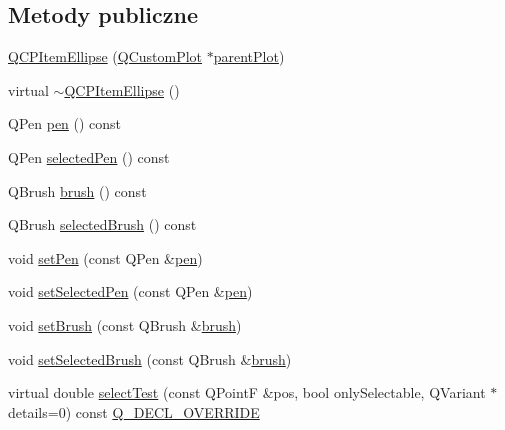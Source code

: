 \subsection*{Metody publiczne}
\begin{DoxyCompactItemize}
\item 
\hyperlink{class_q_c_p_item_ellipse_a759b77ef002515eba0263b5447ecb3fb}{Q\+C\+P\+Item\+Ellipse} (\hyperlink{class_q_custom_plot}{Q\+Custom\+Plot} $\ast$\hyperlink{class_q_c_p_layerable_ab7e0e94461566093d36ffc0f5312b109}{parent\+Plot})
\item 
virtual \hyperlink{class_q_c_p_item_ellipse_a3c17073a1805d32b4e09b6ccde0bef76}{$\sim$\+Q\+C\+P\+Item\+Ellipse} ()
\item 
Q\+Pen \hyperlink{class_q_c_p_item_ellipse_adb67471eabaf1214c99767f1653ca0ed}{pen} () const 
\item 
Q\+Pen \hyperlink{class_q_c_p_item_ellipse_ac52ab52225d238365ff3264b4b69130f}{selected\+Pen} () const 
\item 
Q\+Brush \hyperlink{class_q_c_p_item_ellipse_ac012e4fd59fdb1afb6554937bae8f7e1}{brush} () const 
\item 
Q\+Brush \hyperlink{class_q_c_p_item_ellipse_a0043e401a912d54ea3195bab0967b394}{selected\+Brush} () const 
\item 
void \hyperlink{class_q_c_p_item_ellipse_adb81a663ed2420fcfa011e49f678d1a6}{set\+Pen} (const Q\+Pen \&\hyperlink{class_q_c_p_item_ellipse_adb67471eabaf1214c99767f1653ca0ed}{pen})
\item 
void \hyperlink{class_q_c_p_item_ellipse_a6c542fba1dc918041c583f58a50dde99}{set\+Selected\+Pen} (const Q\+Pen \&\hyperlink{class_q_c_p_item_ellipse_adb67471eabaf1214c99767f1653ca0ed}{pen})
\item 
void \hyperlink{class_q_c_p_item_ellipse_a49fc74e6965834e873d027d026def798}{set\+Brush} (const Q\+Brush \&\hyperlink{class_q_c_p_item_ellipse_ac012e4fd59fdb1afb6554937bae8f7e1}{brush})
\item 
void \hyperlink{class_q_c_p_item_ellipse_a9693501cfaa43a099655c75bed0dab3f}{set\+Selected\+Brush} (const Q\+Brush \&\hyperlink{class_q_c_p_item_ellipse_ac012e4fd59fdb1afb6554937bae8f7e1}{brush})
\item 
virtual double \hyperlink{class_q_c_p_item_ellipse_ab6e2b8a29695c606c7731e498297ca29}{select\+Test} (const Q\+PointF \&pos, bool only\+Selectable, Q\+Variant $\ast$details=0) const \hyperlink{qcustomplot_8hh_a42cc5eaeb25b85f8b52d2a4b94c56f55}{Q\+\_\+\+D\+E\+C\+L\+\_\+\+O\+V\+E\+R\+R\+I\+DE}
\end{DoxyCompactItemize}
